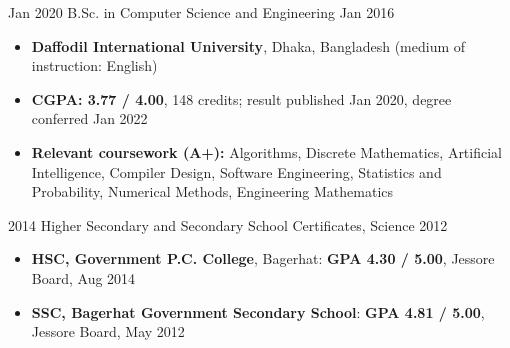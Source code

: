%
%
%


\begin{experiences}
    \mentoring
        {Jan 2020}
        {B.Sc. in Computer Science and Engineering}
        {Jan 2016}
        {
            \begin{itemize}
                \item \textbf{Daffodil International University}, Dhaka, Bangladesh
                    (medium of instruction: English)
                \item \textbf{CGPA: 3.77 / 4.00}, 148 credits; result published Jan 2020,
                    degree conferred Jan 2022
                \item \textbf{Relevant coursework (A+):} Algorithms, Discrete Mathematics,
                    Artificial Intelligence, Compiler Design, Software Engineering,
                    Statistics and Probability, Numerical Methods, Engineering Mathematics
            \end{itemize}
        }
    \mentoring
        {2014}
        {Higher Secondary and Secondary School Certificates, Science}
        {2012}
        {
            \begin{itemize}
                \item \textbf{HSC, Government P.C. College}, Bagerhat: \textbf{GPA 4.30 / 5.00}, Jessore Board, Aug 2014
                \item \textbf{SSC, Bagerhat Government Secondary School}: \textbf{GPA 4.81 / 5.00}, Jessore Board, May 2012
            \end{itemize}
        }
\end{experiences}

